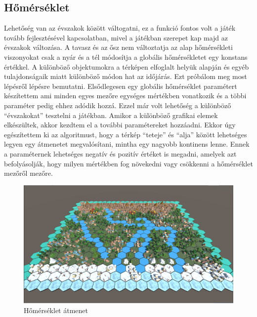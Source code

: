 \subsection{Hőmérséklet}

Lehetőség van az évszakok között váltogatni, ez a funkció fontos volt a játék tovább fejlesztésével kapcsolatban, mivel a játékban szerepet kap majd az évszakok változása. A tavasz és az ősz nem változtatja az alap hőmérsékleti viszonyokat csak a nyár és a tél módosítja a globális hőmérsékletet egy konstans értékkel. 
\newline
\newline A különböző objektumokra a térképen elfoglalt helyük alapján és egyéb tulajdonságaik miatt különböző módon hat az időjárás. Ezt próbálom meg most lépésről lépésre bemutatni.
\newline
\newline Elsődlegesen egy globális hőmérséklet paramétert készítettem ami minden egyes mezőre egységes mértékben vonatkozik és a többi paraméter pedig ehhez adódik hozzá. Ezzel már volt lehetőség a különböző “évszakokat” tesztelni a játékban. Amikor a különböző grafikai elemek elkészültek, akkor kezdtem el a további paramétereket hozzáadni.
\newline
\newline Ekkor úgy egészítettem ki az algoritmust, hogy a térkép “teteje” és “alja” között lehetséges legyen egy átmenetet megvalósítani, mintha egy nagyobb kontinens lenne. Ennek a paraméternek lehetséges negatív és pozitív értéket is megadni, amelyek azt befolyásolják, hogy milyen mértékben fog növekedni vagy csökkenni a hőmérséklet mezőről mezőre.
\newline
\newline

\begin{figure}[h]
\centering
\includegraphics[scale=0.5]{kepek/img11_4_8_1.png}
\caption{Hőmérséklet átmenet}
\label{fig:img11_4_8_1}
\end{figure}

